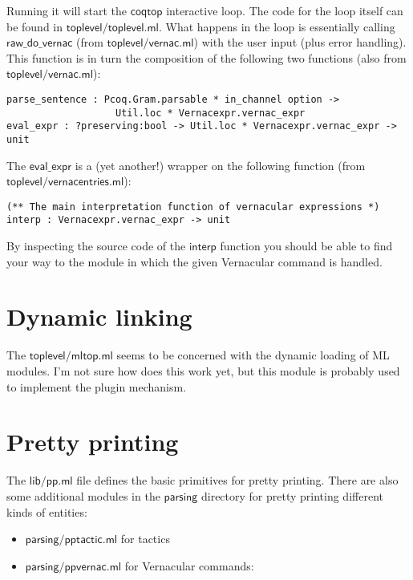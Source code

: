 \documentclass[a4paper,oneside]{book}
\newcommand{\m}[1]{\ensuremath{\mathsf{#1}}}
\begin{document}
Running it will start the \m{coqtop} interactive loop. The code for
the loop itself can be found in \m{toplevel/toplevel.ml}. What happens
in the loop is essentially calling \m{raw\_do\_vernac} (from
\m{toplevel/vernac.ml}) with the user input (plus error
handling). This function is in turn the composition of the following
two functions (also from \m{toplevel/vernac.ml}):

\begin{lstlisting}
parse_sentence : Pcoq.Gram.parsable * in_channel option ->
                   Util.loc * Vernacexpr.vernac_expr
eval_expr : ?preserving:bool -> Util.loc * Vernacexpr.vernac_expr -> unit
\end{lstlisting}

\noindent
The \m{eval\_expr} is a (yet another!) wrapper on the following
function (from \m{toplevel/vernacentries.ml}):

\begin{lstlisting}
(** The main interpretation function of vernacular expressions *)
interp : Vernacexpr.vernac_expr -> unit
\end{lstlisting}

\noindent
By inspecting the source code of the \m{interp} function you should be
able to find your way to the module in which the given Vernacular
command is handled.

\newpage

\section{Dynamic linking}

The \m{toplevel/mltop.ml} seems to be concerned with the dynamic
loading of ML modules. I'm not sure how does this work yet, but this
module is probably used to implement the plugin mechanism.

\section{Pretty printing}

The \m{lib/pp.ml} file defines the basic primitives for pretty
printing. There are also some additional modules in the \m{parsing}
directory for pretty printing different kinds of entities:

\begin{itemize}
\item \m{parsing/pptactic.ml} for tactics
\item \m{parsing/ppvernac.ml} for Vernacular commands:
\end{itemize}
\end{document}
